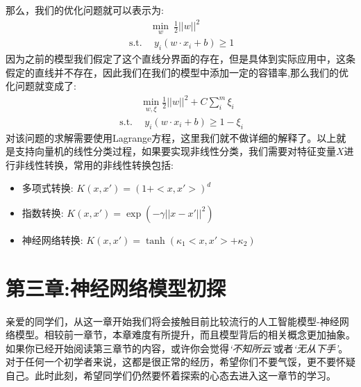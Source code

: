 \documentclass[12pt]{article}
\numberwithin{figure}{section}
\numberwithin{equation}{section}
\begin{document}
那么，我们的优化问题就可以表示为: 
\begin{align*}
	& \min_{w} \ \frac{1}{2} ||w ||^2 \\
	\ \text{s.t.} & \ \ y_i(w \cdot x_i + b)  \geq 1
\end{align*}
因为之前的模型我们假定了这个直线分界面的存在，但是具体到实际应用中，这条假定的直线并不存在，因此我们在我们的模型中添加一定的容错率,那么我们的优化问题就变成了:
\begin{align*}
	& \min_{w, \xi} \frac{1}{2} ||w||^2 + C \sum_{i}^m \xi_i \\
	\ \text{s.t.} & \ \ y_i(w \cdot x_i + b) \geq  1 - \xi_i
\end{align*}
对该问题的求解需要使用Lagrange方程，这里我们就不做详细的解释了。以上就是支持向量机的线性分类过程，如果要实现非线性分类，我们需要对特征变量$X$进行非线性转换，常用的非线性转换包括: 
\begin{itemize}
	\item 多项式转换: $K(x, x') = (1 + <x, x'>)^d$
	\item 指数转换: $K(x, x') = \exp(-\gamma ||x - x'||^2)$
	\item 神经网络转换: $K(x, x') = \tanh (\kappa_1 <x, x'> + \kappa_2)$
\end{itemize}






























\newpage
\part*{第三章:神经网络模型初探}


亲爱的同学们，从这一章开始我们将会接触目前比较流行的人工智能模型-神经网络模型。相较前一章节，本章难度有所提升，而且模型背后的相关概念更加抽象。如果你已经开始阅读第三章节的内容，或许你会觉得\textit{`不知所云'}或者\textit{`无从下手'}。 对于任何一个初学者来说，这都是很正常的经历，希望你们不要气馁，更不要怀疑自己。此时此刻，希望同学们仍然要怀着探索的心态去进入这一章节的学习。
\end{document}
